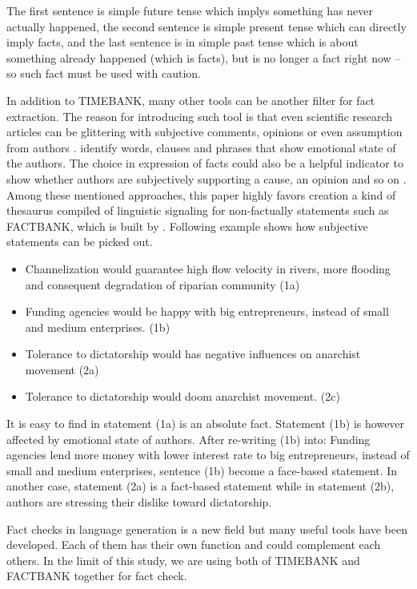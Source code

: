 The first sentence is simple future tense which implys something has never actually happened, the second sentence is simple present tense which can directly imply facts, and the last sentence is in simple past tense which is about something already happened (which is facts), but is no longer a fact right now -- so such fact must be used with caution. 

In addition to TIMEBANK, many other tools can be another filter for fact extraction. The reason for introducing such tool is that even scientific research articles can be glittering with subjective comments, opinions or even assumption from authors \cite{schultze2000confessional}. \cite{dave2003mining} identify words, clauses and phrases that show emotional state of the authors. The choice in expression of facts could also be a helpful indicator to show whether authors are subjectively supporting a cause, an opinion and so on \cite{wiebe2005annotating}. Among these mentioned approaches, this paper highly favors creation a kind of thesaurus compiled of linguistic signaling for non-factually statements such as FACTBANK, which is built by \cite{sauri2009factbank}. Following example shows how subjective statements can be picked out.

\begin{itemize}
	\item Channelization would guarantee high flow velocity in rivers, more flooding and consequent degradation of riparian community (1a)
	\item Funding agencies would be happy with big entrepreneurs, instead of small and medium enterprises. (1b)
	\item Tolerance to dictatorship would has negative influences on anarchist movement (2a)
	\item Tolerance to dictatorship would doom anarchist movement. (2c)
\end{itemize}

It is easy to find in statement (1a) is an absolute fact. Statement (1b) is however affected by emotional state of authors. After re-writing (1b) into: Funding agencies lend more money with lower interest rate to big entrepreneurs, instead of small and medium enterprises, sentence (1b) become a face-based statement. In another case, statement (2a) is a fact-based statement while in statement (2b), authors are stressing their dislike toward dictatorship.

Fact checks in language generation is a new field but many useful tools have been developed. Each of them has their own function and could complement each others. In the limit of this study, we are using both of TIMEBANK and FACTBANK together for fact check.

